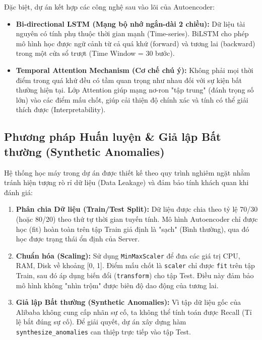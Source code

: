 \documentclass[12pt,a4paper]{article}
\begin{document}
Đặc biệt, dự án kết hợp các công nghệ sau vào lõi của Autoencoder:
\begin{itemize}
    \item \textbf{Bi-directional LSTM (Mạng bộ nhớ ngắn-dài 2 chiều):} Dữ liệu tài nguyên có tính phụ thuộc thời gian mạnh (Time-series). BiLSTM cho phép mô hình học được ngữ cảnh từ cả quá khứ (forward) và tương lai (backward) trong một cửa sổ trượt (Time Window = 30 bước).
    \item \textbf{Temporal Attention Mechanism (Cơ chế chú ý):} Không phải mọi thời điểm trong quá khứ đều có tầm quan trọng như nhau đối với sự kiện bất thường hiện tại. Lớp Attention giúp mạng nơ-ron "tập trung" (đánh trọng số lớn) vào các điểm mấu chốt, giúp cải thiện độ chính xác và tính có thể giải thích được (Interpretability).
\end{itemize}

\subsection{Phương pháp Huấn luyện \& Giả lập Bất thường (Synthetic Anomalies)}
Hệ thống học máy trong dự án được thiết kế theo quy trình nghiêm ngặt nhằm tránh hiện tượng rò rỉ dữ liệu (Data Leakage) và đảm bảo tính khách quan khi đánh giá:

\begin{enumerate}
    \item \textbf{Phân chia Dữ liệu (Train/Test Split):} Dữ liệu được chia theo tỷ lệ 70/30 (hoặc 80/20) theo thứ tự thời gian tuyến tính. Mô hình Autoencoder chỉ được học (fit) hoàn toàn trên tập Train giả định là "sạch" (Bình thường), qua đó học được trạng thái ổn định của Server.
    \item \textbf{Chuẩn hóa (Scaling):} Sử dụng \texttt{MinMaxScaler} để đưa các giá trị CPU, RAM, Disk về khoảng [0, 1]. Điểm mấu chốt là \texttt{scaler} chỉ được \texttt{fit} trên tập Train, sau đó áp dụng biến đổi (\texttt{transform}) cho tập Test. Điều này đảm bảo mô hình không "nhìn trộm" được biên độ dao động của tương lai.
    \item \textbf{Giả lập Bất thường (Synthetic Anomalies):} Vì tập dữ liệu gốc của Alibaba không cung cấp nhãn sự cố, ta không thể tính toán được Recall (Tỉ lệ bắt đúng sự cố). Để giải quyết, dự án xây dựng hàm \texttt{synthesize\_anomalies} can thiệp trực tiếp vào tập Test.
\end{enumerate}
\end{document}
